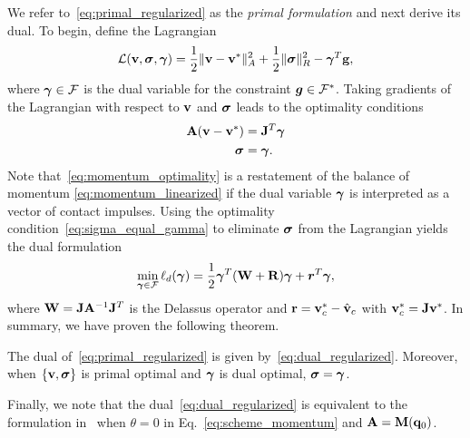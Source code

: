 We refer to~\eqref{eq:primal_regularized} as the \emph{primal formulation}
and next derive its dual. To begin, define the Lagrangian
\begin{equation}
    \mathcal{L}({\mathbf{v}},{\bm\sigma},{\bm{\gamma}}) = 
\frac{1}{2}\Vert{\mathbf{v}}-{\mathbf{v}}^*\Vert_A^2 + \frac{1}{2} \Vert{\bm\sigma}\Vert_{R}^2 - {\bm{\gamma}}^T{\mathbf{g}},
\end{equation}
where ${\bm{\gamma}}\in\mathcal{F}$ is the dual variable for the constraint
${\bm{g}}\in \mathcal{F}^*$. Taking gradients of the Lagrangian with respect to ${\mathbf{v}}$ and ${\bm\sigma}$ leads
to the optimality conditions
\begin{subequations}\label{eq:primal_optimality_conditions}
\begin{align}
    \mf{A}(\mf{v}-\mf{v}^*) &= \mf{J}^T\vf{\gamma} \label{eq:momentum_optimality}\\
    \vf{\sigma} &= \vf{\gamma}.  \label{eq:sigma_equal_gamma}
\end{align}
\end{subequations}
Note that~\eqref{eq:momentum_optimality} is a restatement
of the balance of momentum \eqref{eq:momentum_linearized}
if the dual variable ${\bm\gamma}$ is interpreted as a vector of contact impulses. 
 Using the optimality
condition~\eqref{eq:sigma_equal_gamma} to eliminate ${\bm{\sigma}}$ from the
Lagrangian yields the dual formulation
\begin{align}
    \min_{\bgamma\in \mathcal{F}} \ell_d(\bgamma) =
    \frac{1}{2}\bgamma^T(\mathbf{W}+\mathbf{R})\bgamma + {\bm r}^T
    \bgamma,
	\label{eq:dual_regularized}
\end{align}
where ${\mathbf{W}}={\mathbf{J}}{\mathbf{A}}^{-1}{\mathbf{J}}^T$ is the Delassus operator and
${\mathbf{r}}={\mathbf{v}}_c^*-\hat{{\mathbf{v}}}_c$ with ${\mathbf{v}}_c^*={\mathbf{J}}{\mathbf{v}}^*$.
In summary, we have proven the following theorem.
\begin{theorem}\label{th:primal_dual} The dual of~\eqref{eq:primal_regularized}
	is given by~\eqref{eq:dual_regularized}. Moreover, when $\{{\mathbf{v}},{\bm\sigma}\}$ is
	primal optimal and ${\bm\gamma}$ is dual optimal, ${\bm\sigma} = {\bm\gamma}$.
\end{theorem}

Finally, we note that the dual~\eqref{eq:dual_regularized} is equivalent to the
formulation in~\cite{bib:todorov2011} when $\theta = 0$ in
Eq.~\eqref{eq:scheme_momentum} and ${\mathbf{A}}={\mathbf{M}}({\mathbf{q}}_0)$. 
